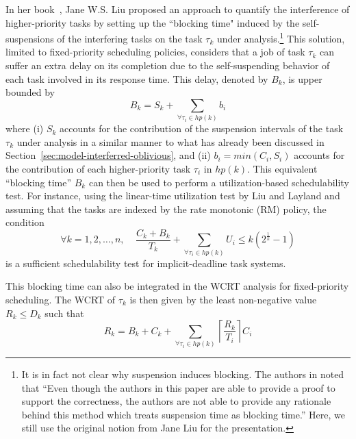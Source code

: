 \label{sec:model-interfering-blocking}

In her book~\cite[Pages 164-165]{Liu:2000:RS:518501}, Jane W.S. Liu proposed an approach to quantify the interference of
higher-priority tasks by setting up the ``blocking time" induced by the self-suspensions of the interfering tasks on the 
task $\tau_k$ under analysis.\footnote{It is in fact not clear why suspension induces blocking.  The authors in \cite{ChenECRTS2016-suspension} noted that ``Even though the authors in this paper are able to provide a proof to support the correctness, the authors are not able to provide any rationale behind this method which treats suspension time as blocking time.'' Here, we still use the original notion from Jane Liu for the presentation.} This solution, limited to fixed-priority scheduling policies, considers that a job of 
task $\tau_k$ can suffer an extra delay on its completion due to the self-suspending behavior of each task involved in its 
response time. This delay, denoted by $B_k$, is upper bounded by 
\begin{equation*}
B_k=S_k+\sum_{\forall \tau_i \in hp(k)} b_i
\end{equation*}
where (i) $S_k$ accounts for the contribution of the suspension intervals of the task $\tau_k$ under analysis in a similar manner to 
what has already been discussed in Section~\ref{sec:model-interferred-oblivious}, and (ii) $b_i=min(C_i, S_i)$ accounts for the contribution of each higher-priority task $\tau_i$ in $hp(k)$. This equivalent ``blocking time'' $B_k$ can then be used to perform a utilization-based schedulability test. For instance, using the linear-time utilization test by Liu and Layland \cite{Liu_1973} and assuming that the tasks are indexed by the rate monotonic (RM) policy, the condition
\begin{equation*}
\forall k=1,2,\ldots, n,\;\;\;\;\frac{C_k+B_k}{T_k} + \sum_{\forall \tau_i \in hp(k)} U_i \leq k (2^{\frac{1}{k}}-1)
\end{equation*}
is a sufficient schedulability test for implicit-deadline task systems.

This blocking time can also be integrated in the WCRT analysis for fixed-priority scheduling. The WCRT of $\tau_k$ is then given by the least non-negative value $R_k \leq D_k$ such that
\begin{equation*}
R_k = B_k + C_k + \sum_{\forall \tau_i \in hp(k)} \left\lceil \frac{R_k}{T_i} \right\rceil C_i
\end{equation*}


